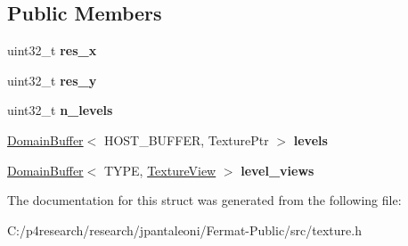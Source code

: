 \subsection*{Public Members}
\begin{DoxyCompactItemize}
\item 
\mbox{\label{struct_mip_map_storage_a76dfa100a3515cf30653577b3c5962a1}} 
uint32\+\_\+t {\bfseries res\+\_\+x}
\item 
\mbox{\label{struct_mip_map_storage_a4c750dbf0ac0c80e14364c026c1850d1}} 
uint32\+\_\+t {\bfseries res\+\_\+y}
\item 
\mbox{\label{struct_mip_map_storage_a27f34997640a7bbe780831e8c22184c4}} 
uint32\+\_\+t {\bfseries n\+\_\+levels}
\item 
\mbox{\label{struct_mip_map_storage_aa7f92834316116fbab5ebe5fc9aa6514}} 
\hyperlink{class_domain_buffer}{Domain\+Buffer}$<$ H\+O\+S\+T\+\_\+\+B\+U\+F\+F\+ER, Texture\+Ptr $>$ {\bfseries levels}
\item 
\mbox{\label{struct_mip_map_storage_a2a5c8a733908a9ba4a3a0f8ee046ccf8}} 
\hyperlink{class_domain_buffer}{Domain\+Buffer}$<$ T\+Y\+PE, \hyperlink{struct_texture_view}{Texture\+View} $>$ {\bfseries level\+\_\+views}
\end{DoxyCompactItemize}


The documentation for this struct was generated from the following file\+:\begin{DoxyCompactItemize}
\item 
C\+:/p4research/research/jpantaleoni/\+Fermat-\/\+Public/src/texture.\+h\end{DoxyCompactItemize}
